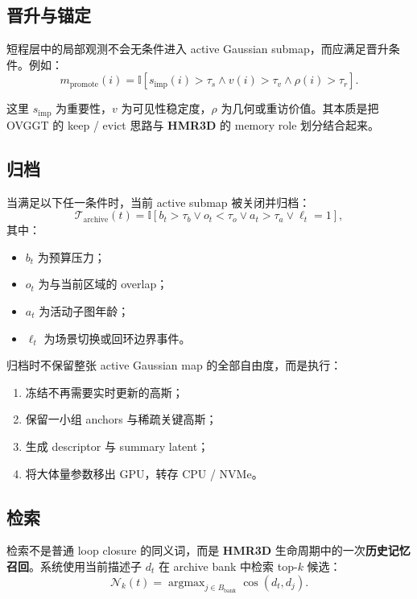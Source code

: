 \documentclass[12pt]{article}
\newcommand{\hmr}{\textbf{HMR3D}}
\newcommand{\argmax}{\mathop{\mathrm{argmax}}}
\begin{document}
\subsection{晋升与锚定}

短程层中的局部观测不会无条件进入 active Gaussian submap，而应满足晋升条件。例如：
\begin{equation}
m_{\text{promote}}(i)=\mathbb{I}[s_{\text{imp}}(i)>\tau_s \land v(i)>\tau_v \land \rho(i)>\tau_r].
\end{equation}

这里 $s_{\text{imp}}$ 为重要性，$v$ 为可见性稳定度，$\rho$ 为几何或重访价值。其本质是把 OVGGT 的 keep / evict 思路与 \hmr{} 的 memory role 划分结合起来。

\subsection{归档}

当满足以下任一条件时，当前 active submap 被关闭并归档：
\begin{equation}
\mathcal{T}_{\text{archive}}(t)=\mathbb{I}[b_t>\tau_b \lor o_t<\tau_o \lor a_t>\tau_a \lor \ell_t=1],
\end{equation}
其中：
\begin{itemize}
  \item $b_t$ 为预算压力；
  \item $o_t$ 为与当前区域的 overlap；
  \item $a_t$ 为活动子图年龄；
  \item $\ell_t$ 为场景切换或回环边界事件。
\end{itemize}

归档时不保留整张 active Gaussian map 的全部自由度，而是执行：
\begin{enumerate}
  \item 冻结不再需要实时更新的高斯；
  \item 保留一小组 anchors 与稀疏关键高斯；
  \item 生成 descriptor 与 summary latent；
  \item 将大体量参数移出 GPU，转存 CPU / NVMe。
\end{enumerate}

\subsection{检索}

检索不是普通 loop closure 的同义词，而是 \hmr{} 生命周期中的一次\textbf{历史记忆召回}。系统使用当前描述子 $d_t$ 在 archive bank 中检索 top-$k$ 候选：
\begin{equation}
\mathcal{N}_k(t)=\argmax_{j \in B_{\text{bank}}} \cos(d_t,d_j).
\end{equation}
\end{document}
